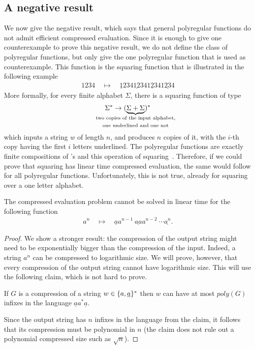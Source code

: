 \documentclass{article}
\begin{document}
\subsection{A negative result}
We now give the negative result, which says that general polyregular functions do not admit efficient compressed evaluation. Since it is enough to give one counterexample to prove this negative  result, we do not define the class of polyregular functions, but only give the one polyregular function that is used as counterexample. This function is the  squaring function that is illustrated in the following example 
\begin{align*}
1234 \quad \mapsto \quad \underline{1}234 \underline{12}34 \underline{123}4 \underline{1234}
\end{align*}
More formally, for every finite alphabet $\Sigma$, there is a squaring function of type 
\begin{align*}
\Sigma^* \to (\myunderbrace{\Sigma + \Sigma}{two copies of the input alphabet, \\ \scriptsize one underlined and one not})^*
\end{align*}
which inputs a string $w$ of length $n$, and produces $n$ copies of it, with the $i$-th copy having the first $i$ letters underlined. The polyregular functions are exactly finite compositions of \sst's and this operation of squaring~\cite{bojanczykPolyregularFunctions2018}. Therefore, if we could prove that squaring has linear time compressed evaluation, the same would follow for all polyregular functions. Unfortunately, this is not true, already for squaring over a one letter alphabet. 
\begin{lemma}\label{lem:nonblind-squaring}
    The   compressed evaluation problem cannot be solved in  linear time  for the  following function
    \begin{align*}
    a^n  \quad \mapsto  \quad  \underline a a^{n-1}\  \underline{aa}a^{n-2}\  \cdots  \underline{a^n}.
    \end{align*}
\end{lemma}
\begin{proof}
    We show a stronger result: the compression of the output string might need to be exponentially bigger than the compression of the input. Indeed, a string $a^n$ can be compressed to logarithmic size. We will prove, however, that every compression of the output string cannot have logarithmic size. This will use the following claim, which is not hard to prove.

    \begin{claim} If $G$ is a compression of a string $w \in \{a,\underline a\}^*$ then $w$ can have at most 
        $
        poly(G)
        $
infixes in the language $\underline a a^* \underline a$.         
    \end{claim}
    Since the output string has $n$ infixes in the language from the claim, it follows that its compression must be polynomial in $n$ (the claim does not rule out a polynomial compressed size such as $\sqrt n$).
\end{proof}
\end{document}
